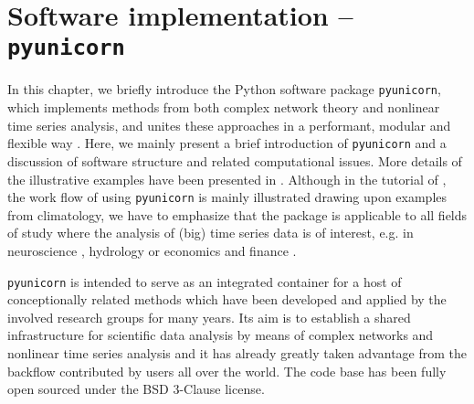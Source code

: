 \section{Software implementation -- \texttt{pyunicorn} }\label{sec:Software}


	In this chapter, we briefly introduce the Python software package \texttt{pyunicorn}, which implements methods from both complex network theory and nonlinear time series analysis, and unites these approaches in a performant, modular and flexible way \cite{Donges2015}. Here, we mainly present a brief introduction of \texttt{pyunicorn} and a discussion of software structure and related computational issues. More details of the illustrative examples have been presented in \cite{Donges2015}. Although in the tutorial of \cite{Donges2015}, the work flow of using \texttt{pyunicorn} is mainly illustrated drawing upon examples from climatology, we have to emphasize that the package is applicable to all fields of study where the analysis of (big) time series data is of interest, e.g. in neuroscience \cite{Bullmore2009,Subramaniyam2014,Subramaniyam2015}, hydrology \cite{sun2015global} or economics and finance \cite{Wang2012}.

	\texttt{pyunicorn} is intended to serve as an integrated container for a host of conceptionally related methods which have been developed and applied by the involved research groups for many years. Its aim is to establish a shared infrastructure for scientific data analysis by means of complex networks and nonlinear time series analysis and it has already greatly taken advantage from the backflow contributed by users all over the world. The code base has been fully open sourced under the BSD 3-Clause license.

